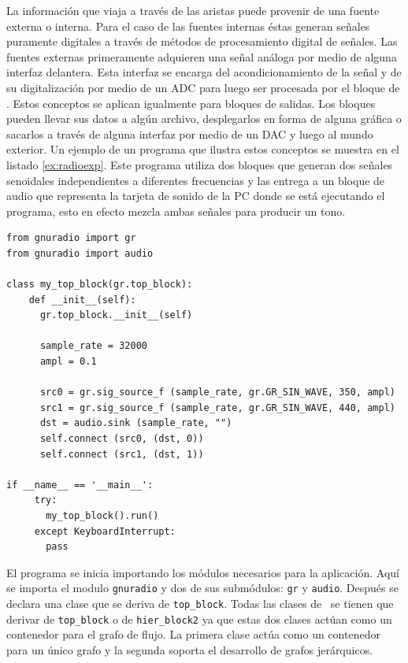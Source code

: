 La informaci\'on que viaja a trav\'es de las aristas puede provenir de una fuente
externa o interna. Para el caso de las fuentes internas \'estas generan se\~nales
puramente digitales a trav\'es de m\'etodos de procesamiento digital de
se\~nales. Las fuentes externas primeramente adquieren una se\~nal an\'aloga por
medio de alguna interfaz delantera. Esta interfaz se encarga del
acondicionamiento de la se\~nal y de su digitalizaci\'on por medio de un ADC
para luego ser procesada por el bloque de \gnuradio. Estos conceptos se
aplican igualmente para bloques de salidas. Los bloques pueden llevar sus
datos a alg\'un archivo, desplegarlos en forma de alguna gr\'afica o sacarlos a
trav\'es de alguna interfaz por medio de un DAC y luego al mundo exterior. Un
ejemplo de un programa que ilustra estos conceptos se muestra en el listado
\ref{ex:radioexp}. Este programa utiliza dos bloques que generan dos se\~nales
senoidales independientes a diferentes frecuencias y las entrega a un bloque de audio que
representa la tarjeta de sonido de la PC donde se est\'a ejecutando el programa,
esto en efecto mezcla ambas se\~nales para producir un tono.

\begin{lstlisting}[float,frame=single,label=ex:radioexp,caption={Ejemplo de programa utilizando \gnuradio}] 
from gnuradio import gr 
from gnuradio import audio

class my_top_block(gr.top_block):
    def __init__(self):
      gr.top_block.__init__(self)

      sample_rate = 32000
      ampl = 0.1

      src0 = gr.sig_source_f (sample_rate, gr.GR_SIN_WAVE, 350, ampl)
      src1 = gr.sig_source_f (sample_rate, gr.GR_SIN_WAVE, 440, ampl)
      dst = audio.sink (sample_rate, "")
      self.connect (src0, (dst, 0))
      self.connect (src1, (dst, 1))

if __name__ == '__main__':
     try:
       my_top_block().run()
     except KeyboardInterrupt:
       pass
\end{lstlisting}

El programa se inicia importando los m\'odulos necesarios para la aplicaci\'on.
Aqu\'i se importa el modulo \verb|gnuradio| y dos de sus subm\'odulos: \verb|gr| y
\verb|audio|. Despu\'es se declara una clase que se deriva de \verb|top_block|.
Todas las clases de \gnuradio\ se tienen que derivar de
\verb|top_block| o de \verb|hier_block2| ya que estas dos clases act\'uan como
un contenedor para el grafo de flujo. La primera clase act\'ua como un
contenedor para un \'unico grafo y la segunda soporta el desarrollo de
grafos jer\'arquicos.


